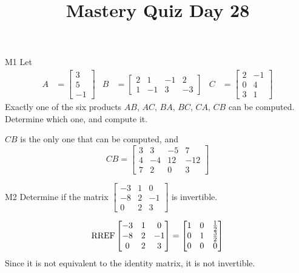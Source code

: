 \documentclass{sbgLAquiz}
\title{Mastery Quiz Day 28 }
\begin{document}
\begin{problem}{M1}
Let 
\begin{align*}
A &= \begin{bmatrix} 3 \\ 5 \\ -1  \end{bmatrix} & B&=\begin{bmatrix}  2 & 1 & -1 & 2 \\ 1 & -1 & 3 & -3  \end{bmatrix} & C &= \begin{bmatrix} 2 & -1 \\ 0 & 4 \\ 3 & 1 \end{bmatrix} \end{align*}
Exactly one of the six products $AB$, $AC$, $BA$, $BC$, $CA$, $CB$ can be computed.  Determine which one, and compute it.
\end{problem}
\begin{solution}
$CB$ is the only one that can be computed, and
$$CB=\begin{bmatrix} 3 & 3 & -5 & 7 \\ 4 & -4 & 12 & -12 \\ 7 & 2 & 0 & 3 \end{bmatrix}$$
\end{solution}
\begin{problem}{M2}
Determine if the matrix $\begin{bmatrix}-3 & 1 & 0 \\ -8 & 2 & -1 \\ 0 & 2 & 3\end{bmatrix}$ is invertible.
\end{problem}
\begin{solution}
$$\operatorname{RREF} \begin{bmatrix}-3 & 1 & 0 \\ -8 & 2 & -1 \\ 0 & 2 & 3\end{bmatrix} = \begin{bmatrix} 1 & 0 & \frac{1}{2} \\ 0 & 1 & \frac{3}{2} \\ 0 & 0 & 0 \end{bmatrix}$$
Since it is not equivalent to the identity matrix, it is not invertible.
\end{solution}
\end{document}
